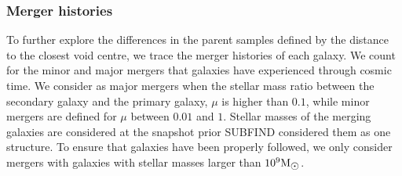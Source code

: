 \documentclass[a4paper,fleqn,usenatbib,letter]{mnras}
\newcommand{\Msun}{\rm M_{\sun}}
\begin{document}
 \subsubsection{Merger histories}
 \label{subsubsec:MHs}
 
 
 To further explore the differences in the parent samples defined by the distance to the closest void centre, we trace the merger histories of each galaxy. We count for the minor and major mergers that galaxies have experienced through cosmic time. We consider as major mergers when  the stellar mass ratio between the secondary galaxy and the primary galaxy, $\mu$ is higher than $0.1$, while minor mergers are defined for $\mu$  between $0.01$ and $1$. Stellar masses of the merging
galaxies are considered at the snapshot prior SUBFIND considered them as one structure. To ensure that galaxies have been properly followed, we only consider mergers with galaxies with stellar masses larger than $10^9 \Msun$. 
\end{document}

